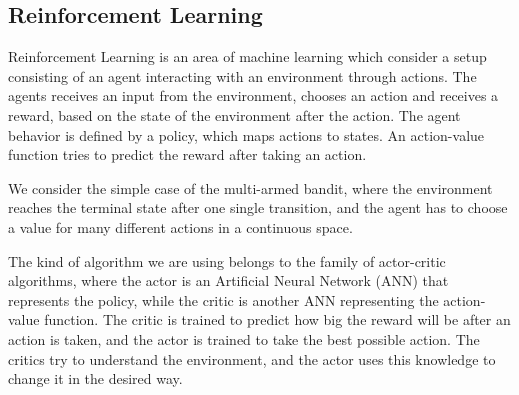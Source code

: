 \subsection{Reinforcement Learning} 

Reinforcement Learning is an area of machine learning which consider a setup consisting of an agent interacting with an environment through actions. The agents receives an input from the environment, chooses an action and receives a reward, based on the state of the environment after the action.
The agent behavior is defined by a policy, which maps actions to states. An action-value function tries to predict the reward after taking an action.

We consider the simple case of the multi-armed bandit, where the environment reaches the terminal state after one single transition, and the agent has to choose a value for many different actions in a continuous space.

The kind of algorithm we are using belongs to the family of actor-critic algorithms, where the actor is an Artificial Neural Network (ANN) that represents the policy, while the critic is another ANN representing the action-value function.
The critic is trained to predict how big the reward will be after an action is taken, and the actor is trained to take the best possible action. The critics try to understand the environment, and the actor uses this knowledge to change it in the desired way.




